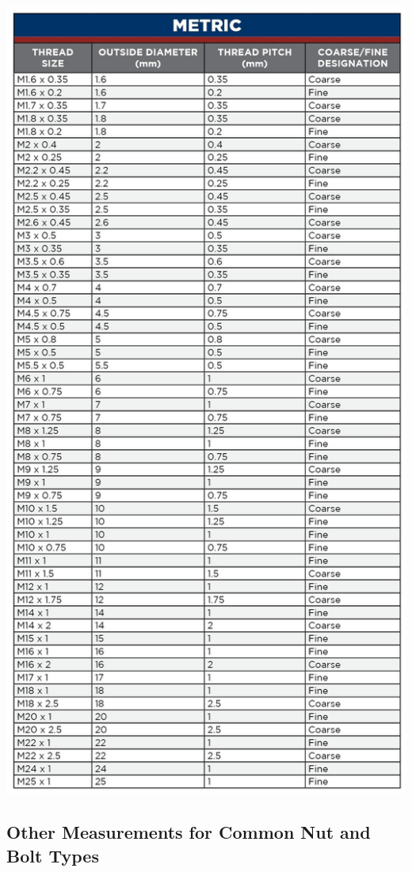 \documentclass[12pt, a4paper]{article}
\begin{document}
		\includegraphics{Introduction to Nut and Bolt Sizes_files/6307baf81ff28690984895.jpg}
		
		\hypertarget{iqru7da}{%
			\subsection{Other Measurements for Common Nut and Bolt
				Types}\label{iqru7da}}
		
\end{document}
